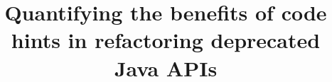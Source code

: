 \documentclass[sigconf,review,anonymous]{acmart}
\begin{document}




\title{Quantifying the benefits of code hints in refactoring deprecated Java APIs }







\end{document}
